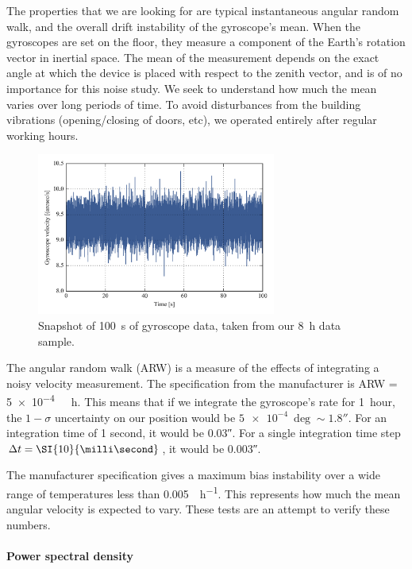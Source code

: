The properties that we are looking for are typical instantaneous angular random walk, and the overall drift instability of the gyroscope's mean. When the gyroscopes are set on the floor, they measure a component of the Earth's rotation vector in inertial space. The mean of the measurement depends on the exact angle at which the device is placed with respect to the zenith vector, and is of no importance for this noise study. We seek to understand how much the mean varies over long periods of time. To avoid disturbances from the building vibrations (opening/closing of doors, etc), we operated entirely after regular working hours.

\begin{figure}[!ht]
		\centering
		\includegraphics[width=0.7\textwidth]{Figures/snapshot_11005.png} 
		\caption[\SI{100}{\second} of gyroscope data]{Snapshot of \SI{100}{\second} of gyroscope data, taken from our \SI{8}{\hour} data sample.}
		\label{fig:snapshot11005}
\end{figure}


The angular random walk (ARW) is a measure of the effects of integrating a noisy velocity measurement. The specification from the manufacturer is ARW = \SI{5e-4}{\deg{}\hour}. This means that if we integrate the gyroscope's rate for 1~hour, the $1-\sigma$ uncertainty on our position would be 
$\SI{5e-4}{\deg}\sim\ang{;;1.8}$. For an integration time of 1 second, it would be \ang{;;0.03}. For a single integration time step $\Deltat = \SI{10}{\milli\second}$, it would be \ang{;;0.003}. 

The manufacturer specification gives a maximum bias instability over a wide range of temperatures less than \SI{0.005}{\deg\per\hour}. This represents how much the mean angular velocity is expected to vary. These tests are an attempt to verify these numbers.


\paragraph{Power spectral density}

